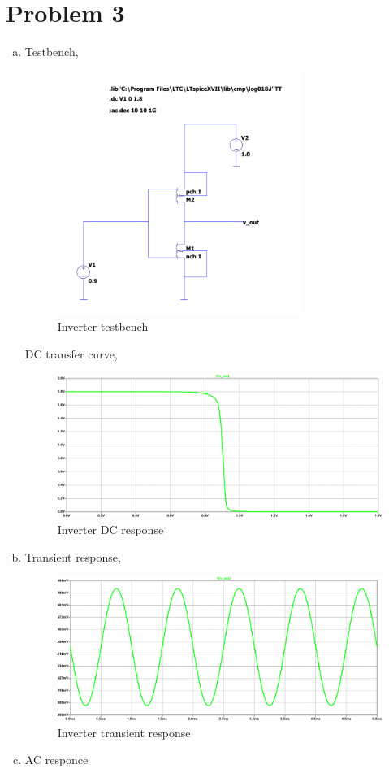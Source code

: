 \documentclass{article}
\begin{document}
\section{Problem 3}
\label{sec:org2eff285}
\begin{enumerate}[(a)]
\item Testbench,
\begin{figure}[H]
\centering
\includegraphics[height=300px]{img/q3/inverter.pdf}
\caption{\label{fig:inv-q3}Inverter testbench}
\end{figure}

DC transfer curve,
\begin{figure}[H]
\centering
\includegraphics[width=.9\linewidth]{img/q3/vout-vin-dc.pdf}
\caption{\label{fig:vout-vin-dc-q3}Inverter DC response}
\end{figure}

\item Transient response,

\begin{figure}[H]
\centering
\includegraphics[width=.9\linewidth]{img/q3/transient.pdf}
\caption{\label{fig:trans-q3}Inverter transient response}
\end{figure}
\item AC responce


\end{enumerate}
\end{document}
